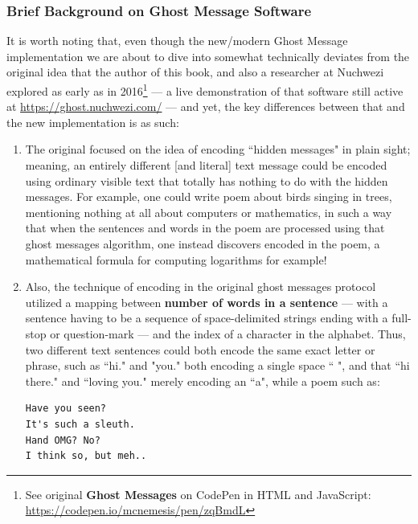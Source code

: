 \documentclass[a4paper, 18pt]{book} %
\begin{document}
{{{\vspace{2em}


\subsubsection{Brief Background on Ghost Message Software}
\label{SECBACKGHOSTMSG}

It is worth noting that, even though the new/modern Ghost Message implementation we are about to dive into somewhat technically deviates from the original idea that the author of this book, and also a researcher at Nuchwezi explored as early as in 2016\footnote{See original \textbf{Ghost Messages} on CodePen in HTML and JavaScript: \url{https://codepen.io/mcnemesis/pen/zqBmdL}} --- a live demonstration of that software still active at \url{https://ghost.nuchwezi.com/} --- and yet, the key differences between that and the new implementation is as such:

\vspace{2em}
\begin{enumerate}
\item The original focused on the idea of encoding ``hidden messages" in plain sight; meaning, an entirely different [and literal] text message could be encoded using ordinary visible text that totally has nothing to do with the hidden messages. For example, one could write poem about birds singing in trees, mentioning nothing at all about computers or mathematics, in such a way that when the sentences and words in the poem are processed using that ghost messages algorithm, one instead discovers encoded in the poem, a mathematical formula for computing logarithms for example!
\item{ Also, the technique of encoding in the original ghost messages protocol utilized a mapping between \textbf{number of words in a sentence} --- with a sentence having to be a sequence of space-delimited strings ending with a full-stop or question-mark --- and the index of a character in the alphabet. Thus, two different text sentences could both encode the same exact letter or phrase, such as ``hi." and "you." both encoding a single space `` ", and that ``hi there." and ``loving you." merely encoding an ``a", while a poem such as:

\vspace{1em}
{\ttfamily
\begin{verbatim}
Have you seen?
It's such a sleuth.
Hand OMG? No?
I think so, but meh..
\end{verbatim}
}
\vspace{1em}

}
\end{enumerate}}}}
\end{document}
